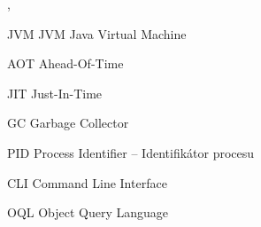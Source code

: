 ,\begin{seznamzkratek}{JVM}
		{JVM}
		{Java Virtual Machine}

		{AOT}
		{Ahead-Of-Time}

		{JIT}
		{Just-In-Time}
	
		{GC}
		{Garbage Collector}
	
		{PID}
		{Process Identifier -- Identifikátor procesu}

		{CLI}
		{Command Line Interface}

		{OQL}
		{Object Query Language}
\end{seznamzkratek}
